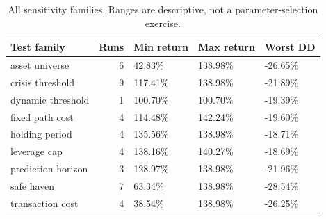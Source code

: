 \begin{table}[htbp]
\caption{All sensitivity families. Ranges are descriptive, not a parameter-selection exercise.}
\label{tab:robustness}
\begin{tabular}{lrlll}
\toprule
Test family & Runs & Min return & Max return & Worst DD \\
\midrule
asset universe & 6 & 42.83\% & 138.98\% & -26.65\% \\
crisis threshold & 9 & 117.41\% & 138.98\% & -21.89\% \\
dynamic threshold & 1 & 100.70\% & 100.70\% & -19.39\% \\
fixed path cost & 4 & 114.48\% & 142.24\% & -19.60\% \\
holding period & 4 & 135.56\% & 138.98\% & -18.71\% \\
leverage cap & 4 & 138.16\% & 140.27\% & -18.69\% \\
prediction horizon & 3 & 128.97\% & 138.98\% & -21.96\% \\
safe haven & 7 & 63.34\% & 138.98\% & -28.54\% \\
transaction cost & 4 & 38.54\% & 138.98\% & -26.25\% \\
\bottomrule
\end{tabular}
\end{table}
